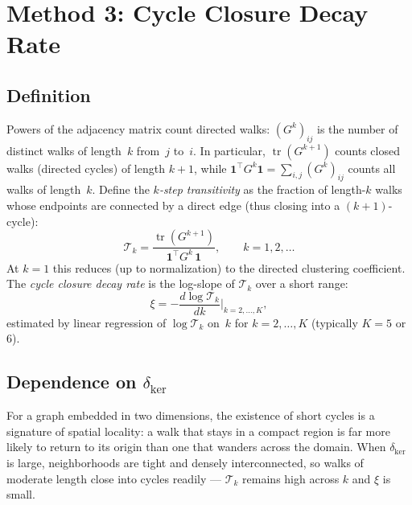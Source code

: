 \documentclass[11pt]{article}
\begin{document}
\section{Method 3: Cycle Closure Decay Rate}
\label{sec:cycles}

\subsection{Definition}

Powers of the adjacency matrix count directed walks: $(G^k)_{ij}$ is
the number of distinct walks of length~$k$ from~$j$ to~$i$.  In
particular, $\operatorname{tr}(G^{k+1})$ counts closed walks
(directed cycles) of length $k{+}1$, while
$\mathbf{1}^{\!\top}G^k\mathbf{1}=\sum_{i,j}(G^k)_{ij}$ counts all
walks of length~$k$.  Define the \emph{$k$-step transitivity} as the
fraction of length-$k$ walks whose endpoints are connected by a
direct edge (thus closing into a $(k{+}1)$-cycle):
\begin{equation}
  \mathcal{T}_k
  = \frac{\operatorname{tr}(G^{k+1})}
         {\mathbf{1}^{\!\top}G^k\,\mathbf{1}},
  \qquad k=1,2,\dots
  \label{eq:transitivity_k}
\end{equation}
At $k=1$ this reduces (up to normalization) to the directed
clustering coefficient.  The \emph{cycle closure decay rate} is the
log-slope of $\mathcal{T}_k$ over a short range:
\begin{equation}
  \xi
  = -\frac{d\log\mathcal{T}_k}{dk}
  \bigg|_{k=2,\dots,K},
  \label{eq:xi}
\end{equation}
estimated by linear regression of $\log\mathcal{T}_k$ on~$k$ for
$k=2,\dots,K$ (typically $K=5$ or $6$).

\subsection{Dependence on $\delta_{\mathrm{ker}}$}

For a graph embedded in two dimensions, the existence of short cycles
is a signature of spatial locality: a walk that stays in a compact
region is far more likely to return to its origin than one that
wanders across the domain.  When $\delta_{\mathrm{ker}}$ is large,
neighborhoods are tight and densely interconnected, so walks of
moderate length close into cycles readily --- $\mathcal{T}_k$ remains
high across $k$ and $\xi$ is small.
\end{document}
